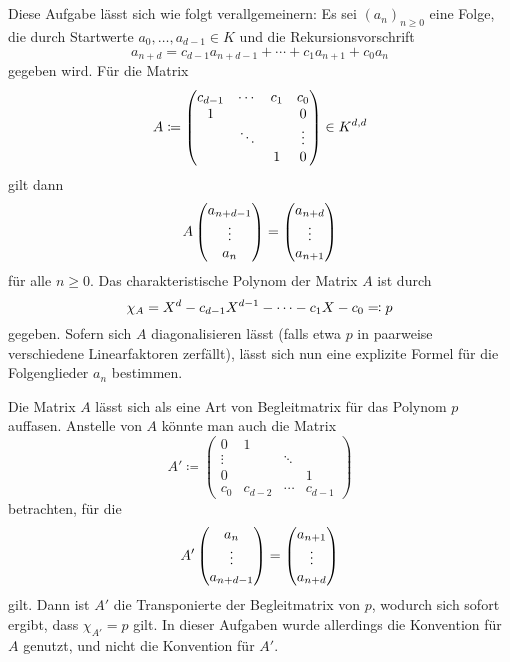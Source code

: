 \section{}

Diese Aufgabe lässt sich wie folgt verallgemeinern:
Es sei $(a_n)_{n \geq 0}$ eine Folge, die durch Startwerte $a_0, \dotsc, a_{d-1} \in K$ und die Rekursionsvorschrift
\[
    a_{n+d}
  = c_{d-1} a_{n+d-1} + \dotsb + c_1 a_{n+1} + c_0 a_{n}
\]
gegeben wird.
Für die Matrix
\[
            A
  \coloneqq \begin{pmatrix}
              c_{d-1} & \cdots  & c_1 & c_0     \\
              1       &         &     & 0       \\
                      & \ddots  &     & \vdots  \\
                      &         & 1   & 0
            \end{pmatrix}
  \in       \matrices{d}{K}
\]
gilt dann
\[
    A \columnvector{a_{n+d-1} \\ \vdots \\ a_n}
  =   \columnvector{a_{n+d} \\ \vdots \\ a_{n+1}}
\]
für alle $n \geq 0$.
Das charakteristische Polynom der Matrix $A$ ist durch
\[
              \charpol{A}
  =           X^d - c_{d-1} X^{d-1} - \dotsb - c_1 X - c_0
  \definedas  p
\]
gegeben.
Sofern sich $A$ diagonalisieren lässt (falls etwa $p$ in paarweise verschiedene Linearfaktoren zerfällt), lässt sich nun eine explizite Formel für die Folgenglieder $a_n$ bestimmen.

\begin{remark}
  Die Matrix $A$ lässt sich als eine Art von Begleitmatrix für das Polynom $p$ auffasen.
  Anstelle von $A$ könnte man auch die Matrix
  \[
              A'
    \coloneqq \begin{pmatrix}
                0       & 1       &         &         \\
                \vdots  &         & \ddots  &         \\
                0       &         &         & 1       \\
                c_0     & c_{d-2} & \cdots  & c_{d-1}
              \end{pmatrix}
  \]
  betrachten, für die
  \[
      A' \columnvector{a_n \\ \vdots \\ a_{n+d-1}}
    =    \columnvector{a_{n+1} \\ \vdots \\ a_{n+d}}
  \]
  gilt.
  Dann ist $A'$ die Transponierte der Begleitmatrix von $p$, wodurch sich sofort ergibt, dass $\chi_{A'} = p$ gilt.
  In dieser Aufgaben wurde allerdings die Konvention für $A$ genutzt, und nicht die Konvention für $A'$.
\end{remark}


